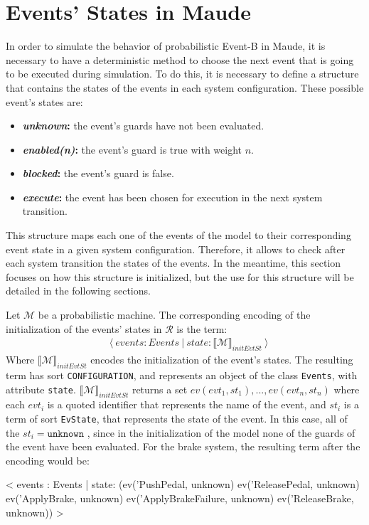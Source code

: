 \section{Events' States in Maude}
In order to simulate the behavior of probabilistic Event-B in Maude, it is necessary to have a deterministic method to choose the next event that is going to be executed during simulation. To do this, it is necessary to define a structure that contains the states of the events in each system configuration. These possible event's states are:
\begin{itemize}
    \item \textbf{\textit{unknown}:} the event's guards have not been evaluated.
    \item \textbf{\textit{enabled(n)}:} the event's guard is true with weight $n$.
    \item \textbf{\textit{blocked}:} the event's guard is false.
    \item \textbf{\textit{execute}:} the event has been chosen for execution in the next system transition.
\end{itemize}
This structure maps each one of the events of the model to their corresponding event state in a given system configuration. Therefore, it allows to check after each system transition the states of the events. In the meantime, this section focuses on how this structure is initialized, but the use for this structure will be detailed in the following sections.

Let $\mathscr{M}$ be a probabilistic machine. The corresponding encoding of the initialization of the events' states in $\mathscr{R}$ is the term:
    \begin{align*}
    & \langle \ events : Events \ | \ state :  \llbracket \mathscr{M} \rrbracket_{initEvtSt}  \ \rangle
    \end{align*}
Where $\llbracket \mathscr{M} \rrbracket_{initEvtSt}$ encodes the initialization of the event's states. The resulting term has sort \texttt{CONFIGURATION}, and represents an object of the class \texttt{Events}, with attribute \texttt{state}. $\llbracket \mathscr{M} \rrbracket_{initEvtSt}$ returns a set $ev(evt_1,st_1), ..., ev(evt_n,st_n)$ where each $evt_i$ is a quoted identifier that represents the name of the event, and $st_i$ is a term of sort \texttt{EvState}, that represents the state of the event. In this case, all of the $st_i = \texttt{unknown}$ , since in the initialization of the model none of the guards of the event have been evaluated. For the brake system, the resulting term after the encoding would be:
\begin{maude}

< events : Events | state: (ev('PushPedal, unknown) 
                            ev('ReleasePedal, unknown) 
                            ev('ApplyBrake, unknown) 
                            ev('ApplyBrakeFailure, unknown) 
                            ev('ReleaseBrake, unknown)) >
\end{maude}

